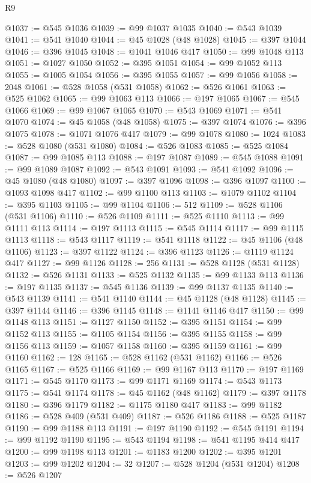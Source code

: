 \begin{lexlean}{R9}
\begin{coremodule}
{{{{{{{{{{{{{{{{{{{{{{{{{{{{{{{{{{{{{{{{{{{{{{{{{{{{{{{{{{{{{{{{{{{{{{{{{{{{{{{{{{{{@1037 := @545 @1036
@1039 := @99 @1037 @1035
@1040 := @543 @1039
@1041 := @541 @1040
@1044 := @45 @1028 (@48 @1028)
@1045 := @397 @1044
@1046 := @396 @1045
@1048 := @1041 @1046 @417
@1050 := @99 @1048 @113
@1051 := @1027 @1050
@1052 := @395 @1051
@1054 := @99 @1052 @113
@1055 := @1005 @1054
@1056 := @395 @1055
@1057 := @99 @1056
@1058 := 2048
@1061 := @528 @1058 (@531 @1058)
@1062 := @526 @1061
@1063 := @525 @1062
@1065 := @99 @1063 @113
@1066 := @197 @1065
@1067 := @545 @1066
@1069 := @99 @1067 @1065
@1070 := @543 @1069
@1071 := @541 @1070
@1074 := @45 @1058 (@48 @1058)
@1075 := @397 @1074
@1076 := @396 @1075
@1078 := @1071 @1076 @417
@1079 := @99 @1078
@1080 := 1024
@1083 := @528 @1080 (@531 @1080)
@1084 := @526 @1083
@1085 := @525 @1084
@1087 := @99 @1085 @113
@1088 := @197 @1087
@1089 := @545 @1088
@1091 := @99 @1089 @1087
@1092 := @543 @1091
@1093 := @541 @1092
@1096 := @45 @1080 (@48 @1080)
@1097 := @397 @1096
@1098 := @396 @1097
@1100 := @1093 @1098 @417
@1102 := @99 @1100 @113
@1103 := @1079 @1102
@1104 := @395 @1103
@1105 := @99 @1104
@1106 := 512
@1109 := @528 @1106 (@531 @1106)
@1110 := @526 @1109
@1111 := @525 @1110
@1113 := @99 @1111 @113
@1114 := @197 @1113
@1115 := @545 @1114
@1117 := @99 @1115 @1113
@1118 := @543 @1117
@1119 := @541 @1118
@1122 := @45 @1106 (@48 @1106)
@1123 := @397 @1122
@1124 := @396 @1123
@1126 := @1119 @1124 @417
@1127 := @99 @1126
@1128 := 256
@1131 := @528 @1128 (@531 @1128)
@1132 := @526 @1131
@1133 := @525 @1132
@1135 := @99 @1133 @113
@1136 := @197 @1135
@1137 := @545 @1136
@1139 := @99 @1137 @1135
@1140 := @543 @1139
@1141 := @541 @1140
@1144 := @45 @1128 (@48 @1128)
@1145 := @397 @1144
@1146 := @396 @1145
@1148 := @1141 @1146 @417
@1150 := @99 @1148 @113
@1151 := @1127 @1150
@1152 := @395 @1151
@1154 := @99 @1152 @113
@1155 := @1105 @1154
@1156 := @395 @1155
@1158 := @99 @1156 @113
@1159 := @1057 @1158
@1160 := @395 @1159
@1161 := @99 @1160
@1162 := 128
@1165 := @528 @1162 (@531 @1162)
@1166 := @526 @1165
@1167 := @525 @1166
@1169 := @99 @1167 @113
@1170 := @197 @1169
@1171 := @545 @1170
@1173 := @99 @1171 @1169
@1174 := @543 @1173
@1175 := @541 @1174
@1178 := @45 @1162 (@48 @1162)
@1179 := @397 @1178
@1180 := @396 @1179
@1182 := @1175 @1180 @417
@1183 := @99 @1182
@1186 := @528 @409 (@531 @409)
@1187 := @526 @1186
@1188 := @525 @1187
@1190 := @99 @1188 @113
@1191 := @197 @1190
@1192 := @545 @1191
@1194 := @99 @1192 @1190
@1195 := @543 @1194
@1198 := @541 @1195 @414 @417
@1200 := @99 @1198 @113
@1201 := @1183 @1200
@1202 := @395 @1201
@1203 := @99 @1202
@1204 := 32
@1207 := @528 @1204 (@531 @1204)
@1208 := @526 @1207
}}}}}}}}}}}}}}}}}}}}}}}}}}}}}}}}}}}}}}}}}}}}}}}}}}}}}}}}}}}}}}}}}}}}}}}}}}}}}}}}}}}}
\end{coremodule}
\end{lexlean}
